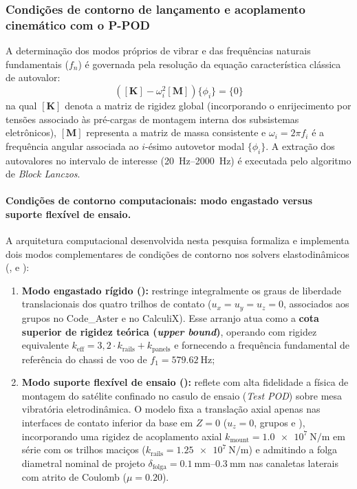 \subsubsection{Condições de contorno de lançamento e acoplamento cinemático com o P-POD}
\label{subsubsec:modal}

A determinação dos modos próprios de vibrar e das frequências naturais fundamentais ($f_n$) é governada pela resolução da equação característica clássica de autovalor:
\begin{equation}
  \left( [\mathbf{K}] - \omega_i^{2} [\mathbf{M}] \right) \{\phi_i\} = \{0\}
  \label{eq:autovalor}
\end{equation}
na qual $[\mathbf{K}]$ denota a matriz de rigidez global (incorporando o enrijecimento por tensões associado às pré-cargas de montagem interna dos subsistemas eletrônicos), $[\mathbf{M}]$ representa a matriz de massa consistente e $\omega_i = 2\pi f_i$ é a frequência angular associada ao $i$-ésimo autovetor modal $\{\phi_i\}$. A extração dos autovalores no intervalo de interesse (\SIrange{20}{2000}{\hertz}) é executada pelo algoritmo de \textit{Block Lanczos}.

\paragraph*{Condições de contorno computacionais: modo engastado versus suporte flexível de ensaio.}
A arquitetura computacional desenvolvida nesta pesquisa formaliza e implementa dois modos complementares de condições de contorno nos solvers elastodinâmicos (,  e ):
\begin{enumerate}
  \item \textbf{Modo engastado rígido ():} restringe integralmente os graus de liberdade translacionais dos quatro trilhos de contato ($u_x = u_y = u_z = 0$, associados aos grupos  no Code\_Aster e  no CalculiX). Esse arranjo atua como a \textbf{cota superior de rigidez teórica (\textit{upper bound})}, operando com rigidez equivalente $k_{\text{eff}} = 3{,}2 \cdot k_{\text{rails}} + k_{\text{panels}}$ e fornecendo a frequência fundamental de referência do chassi de voo de $f_1 = \SI{579.62}{\hertz}$;
  \item \textbf{Modo suporte flexível de ensaio ():} reflete com alta fidelidade a física de montagem do satélite confinado no casulo de ensaio (\textit{Test POD}) sobre mesa vibratória eletrodinâmica. O modelo fixa a translação axial apenas nas interfaces de contato inferior da base em $Z = 0$ ($u_z = 0$, grupos  e ), incorporando uma rigidez de acoplamento axial $k_{\text{mount}} = \SI{1.0e7}{\newton\per\metre}$ em série com os trilhos maciços ($k_{\text{rails}} = \SI{1.25e7}{\newton\per\metre}$) e admitindo a folga diametral nominal de projeto $\delta_{\text{folga}} = \SIrange{0.1}{0.3}{\milli\metre}$ nas canaletas laterais com atrito de Coulomb ($\mu = \num{0.20}$).
\end{enumerate}


